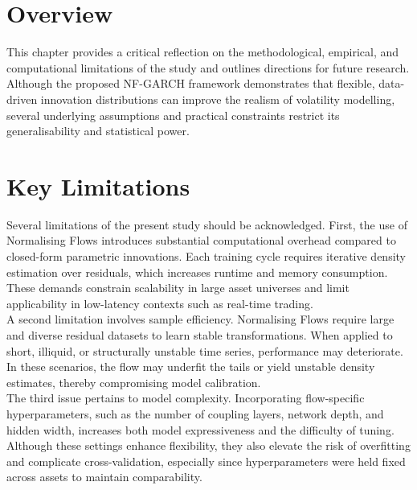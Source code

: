 \documentclass[oneside,12pt]{CUEDthesisPSnPDF}
\begin{document}
\section{Overview}
\noindent
This chapter provides a critical reflection on the methodological, empirical, and computational limitations of the study and outlines directions for future research. Although the proposed NF-GARCH framework demonstrates that flexible, data-driven innovation distributions can improve the realism of volatility modelling, several underlying assumptions and practical constraints restrict its generalisability and statistical power.\\


\section{Key Limitations}
\label{sec:limitations}
\noindent
Several limitations of the present study should be acknowledged.  
First, the use of Normalising Flows introduces substantial computational overhead compared to closed-form parametric innovations. Each training cycle requires iterative density estimation over residuals, which increases runtime and memory consumption. These demands constrain scalability in large asset universes and limit applicability in low-latency contexts such as real-time trading.\\

\medskip
\noindent
A second limitation involves sample efficiency. Normalising Flows require large and diverse residual datasets to learn stable transformations. When applied to short, illiquid, or structurally unstable time series, performance may deteriorate. In these scenarios, the flow may underfit the tails or yield unstable density estimates, thereby compromising model calibration.\\

\medskip
\noindent
The third issue pertains to model complexity. Incorporating flow-specific hyperparameters, such as the number of coupling layers, network depth, and hidden width, increases both model expressiveness and the difficulty of tuning. Although these settings enhance flexibility, they also elevate the risk of overfitting and complicate cross-validation, especially since hyperparameters were held fixed across assets to maintain comparability.\\
\end{document}
